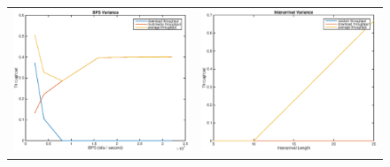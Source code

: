 \begin{figure}
\begin{tabular}{cc}

\includegraphics[scale=0.35]{../../src/fig-simulation_download_multimedia-bps-1_1_5_5_12000.eps} & \includegraphics[scale=0.35]{../../src/fig-simulation_random_download-interarival-1_0_1_0_1_1_25.eps} \\

\end{tabular}
\end{figure}
